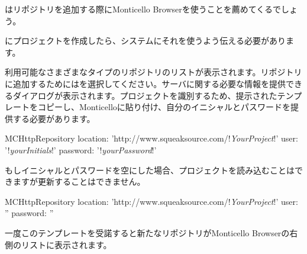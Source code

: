 \documentclass[a4paper,10pt,twoside]{book}
\begin{document}
\sqsrc はリポジトリを追加する際にMonticello Browserを使うことを薦めてくるでしょう。

\sqsrc にプロジェクトを作成したら、\pharo システムにそれを使うよう伝える必要があります。

利用可能なさまざまなタイプのリポジトリのリストが表示されます。\sqsrc リポジトリに追加するためにはを選択してください。サーバに関する必要な情報を提供できるダイアログが表示されます。\sqsrc プロジェクトを識別するため、提示されたテンプレートをコピーし、Monticelloに貼り付け、自分のイニシャルとパスワードを提供する必要があります。

\begin{code}{}
MCHttpRepository
    location: 'http://www.squeaksource.com/!\emph{YourProject}!'
    user: '!\emph{yourInitials}!'
    password: '!\emph{yourPassword}!'
\end{code}

\noindent
もしイニシャルとパスワードを空にした場合、プロジェクトを読み込むことはできますが更新することはできません。

\begin{code}{}
MCHttpRepository
    location: 'http://www.squeaksource.com/!\emph{YourProject}!'
    user: ''
    password: ''
\end{code}

一度このテンプレートを受諾すると新たなリポジトリがMonticello Browserの右側のリストに表示されます。
\end{document}
